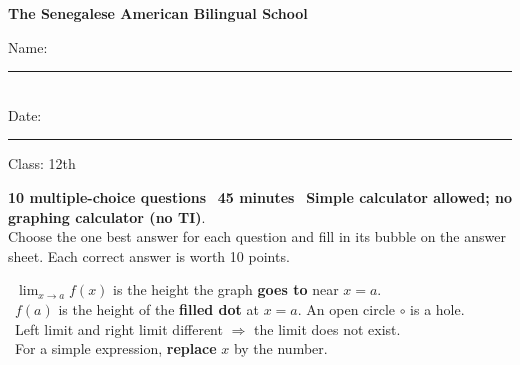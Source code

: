 \documentclass[11pt]{article}
\begin{document}
{\centering\sffamily\bfseries\Large\color{apnavy}The Senegalese American Bilingual School\par}\vspace{6pt}

\ifkey\else
\begin{minipage}[t]{0.56\linewidth}\vspace{0pt}
\begin{tcolorbox}[colback=white,colframe=apnavy,boxrule=0.6pt,arc=3pt,left=8pt,right=8pt]
\sffamily Name: \rule{5.8cm}{0.4pt}\\[10pt] Date: \rule{2.8cm}{0.4pt}\quad Class: 12th
\end{tcolorbox}
\begin{directions}
\textbf{10 multiple-choice questions} \textbullet\ \textbf{45 minutes} \textbullet\ \textbf{Simple calculator allowed; no graphing calculator (no TI)}.\\
Choose the one best answer for each question and fill in its bubble on the answer sheet. Each correct answer is worth 10 points.
\end{directions}
\vspace{4pt}
\begin{tcolorbox}[colback=apgold!10,colframe=apgold!80!black,boxrule=0.5pt,arc=3pt,left=8pt,right=8pt,title={\sffamily\bfseries Remember},colbacktitle=apgold!80!black]
\small
\textbullet\ $\displaystyle\lim_{x\to a}f(x)$ is the height the graph \textbf{goes to} near $x=a$.\\[2pt]
\textbullet\ $f(a)$ is the height of the \textbf{filled dot} at $x=a$. An open circle $\circ$ is a hole.\\[2pt]
\textbullet\ Left limit and right limit different $\Rightarrow$ the limit does not exist.\\[2pt]
\textbullet\ For a simple expression, \textbf{replace} $x$ by the number.
\end{tcolorbox}
\vspace{4pt}
\begin{center}
\end{center}
\end{minipage}\hfill
\end{document}
